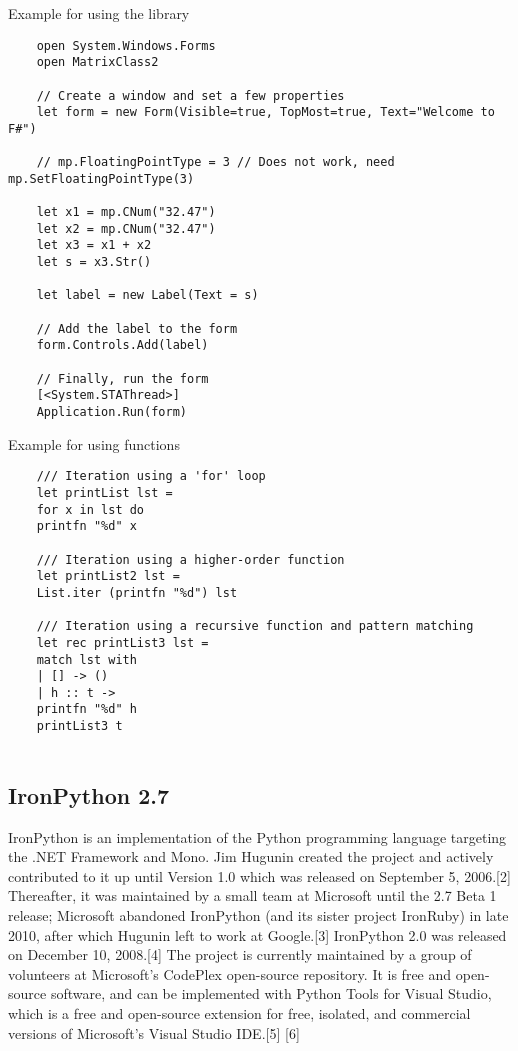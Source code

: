 	
	
	\vpara
	Example for using the library
	
	\begin{lstlisting}
	open System.Windows.Forms
	open MatrixClass2
	
	// Create a window and set a few properties
	let form = new Form(Visible=true, TopMost=true, Text="Welcome to F#")
	
	// mp.FloatingPointType = 3 // Does not work, need mp.SetFloatingPointType(3)
	
	let x1 = mp.CNum("32.47")
	let x2 = mp.CNum("32.47")
	let x3 = x1 + x2
	let s = x3.Str()
	
	let label = new Label(Text = s)
	
	// Add the label to the form
	form.Controls.Add(label)
	
	// Finally, run the form
	[<System.STAThread>]
	Application.Run(form)
	\end{lstlisting}
	
	
	
	
	\vpara
	Example for using functions
	
	\begin{lstlisting}
	/// Iteration using a 'for' loop
	let printList lst = 
	for x in lst do
	printfn "%d" x
	
	/// Iteration using a higher-order function
	let printList2 lst = 
	List.iter (printfn "%d") lst
	
	/// Iteration using a recursive function and pattern matching
	let rec printList3 lst =
	match lst with
	| [] -> ()
	| h :: t ->
	printfn "%d" h
	printList3 t
	
	\end{lstlisting}
	
	
	
	
	
	
	
	\newpage
	\subsection{IronPython 2.7}
	IronPython is an implementation of the Python programming language targeting the .NET Framework and Mono. Jim Hugunin created the project and actively contributed to it up until Version 1.0 which was released on September 5, 2006.[2] Thereafter, it was maintained by a small team at Microsoft until the 2.7 Beta 1 release; Microsoft abandoned IronPython (and its sister project IronRuby) in late 2010, after which Hugunin left to work at Google.[3] IronPython 2.0 was released on December 10, 2008.[4] The project is currently maintained by a group of volunteers at Microsoft's CodePlex open-source repository. It is free and open-source software, and can be implemented with Python Tools for Visual Studio, which is a free and open-source extension for free, isolated, and commercial versions of Microsoft's Visual Studio IDE.[5] [6]
	

